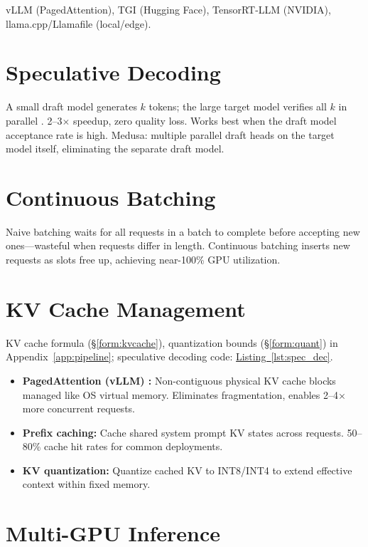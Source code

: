 vLLM (PagedAttention), TGI (Hugging Face), TensorRT-LLM (NVIDIA), llama.cpp/Llamafile (local/edge).

\section{Speculative Decoding}

A small draft model generates $k$ tokens; the large target model verifies all $k$ in parallel \parencite{leviathan2023fast}. 2--3$\times$ speedup, zero quality loss. Works best when the draft model acceptance rate is high. Medusa: multiple parallel draft heads on the target model itself, eliminating the separate draft model.

\section{Continuous Batching}

Naive batching waits for all requests in a batch to complete before accepting new ones---wasteful when requests differ in length. Continuous batching \parencite{yu2022orca} inserts new requests as slots free up, achieving near-100\% GPU utilization.

\section{KV Cache Management}

KV cache formula (\hyperref[form:kvcache]{\S\ref*{form:kvcache}}), quantization bounds (\hyperref[form:quant]{\S\ref*{form:quant}}) in Appendix~\ref{app:pipeline}; speculative decoding code: \hyperref[lst:spec_dec]{Listing~\ref*{lst:spec_dec}}.

\begin{itemize}
  \item \textbf{PagedAttention (vLLM) \parencite{kwon2023efficient}:} Non-contiguous physical KV cache blocks managed like OS virtual memory. Eliminates fragmentation, enables 2--4$\times$ more concurrent requests.
  \item \textbf{Prefix caching:} Cache shared system prompt KV states across requests. 50--80\% cache hit rates for common deployments.
  \item \textbf{KV quantization:} Quantize cached KV to INT8/INT4 to extend effective context within fixed memory.
\end{itemize}

\section{Multi-GPU Inference}

